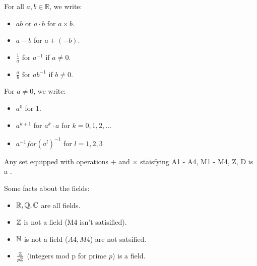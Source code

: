 \documentclass[11pt]{article}
\begin{document}
For all \(a, b \in \mathbb{R}\), we write:
\begin{itemize}
    \item \(ab\) or \(a \cdot b\) for \(a \times b\).
    \item \(a - b\) for \(a + (-b)\).
    \item \(\frac{1}{a}\) for \(a^{-1}\) if \(a \neq 0\).
    \item \(\frac{a}{b}\) for \(a b^{-1}\) if \(b \neq 0\).
\end{itemize}
For \(a \neq 0\), we write:
\begin{itemize}
    \item \(a^0\) for 1.
    \item \(a^{k + 1}\) for \(a^k \cdot a\) for \(k = 0, 1, 2, \ldots\)
    \item \(a^{-1} for (a^l)^{-1}\) for \(l = 1, 2, 3\)
\end{itemize}

\begin{definition}
    Any set equipped with operations \(+\) and \(\times\) staisfying A1 - A4, M1 - M4, Z, D is a .
\end{definition}
\begin{fact}
    Some facts about the fields:

    \begin{itemize}
        \item \(\mathbb R, \mathbb Q, \mathbb C\) are all fields.
        \item \(\mathbb Z\) is not a field (M4 isn't satisified).
        \item \(\mathbb N\) is not a field (\(A4, M4\)) are not satsified.
        \item \(\frac{\mathbb Z}{p\mathbb Z}\) (integers mod p for prime \(p\)) is a field.
    \end{itemize}
\end{fact}
\end{document}
